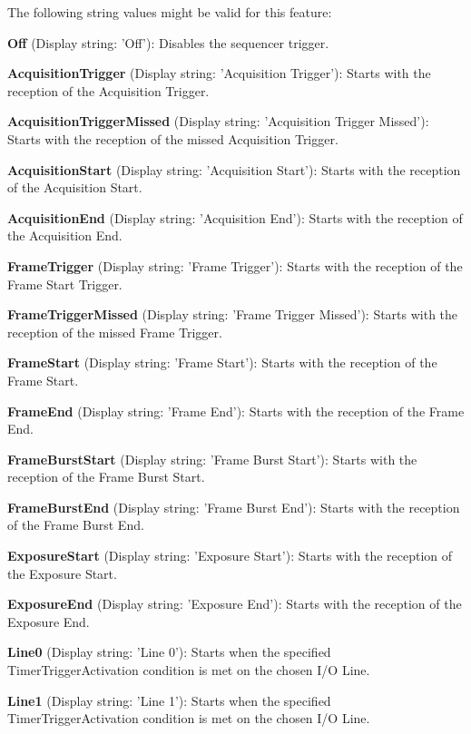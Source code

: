 The following string values might be valid for this feature\+:
\begin{DoxyItemize}
\item {\bfseries Off} (Display string\+: 'Off')\+: Disables the sequencer trigger.
\item {\bfseries Acquisition\+Trigger} (Display string\+: 'Acquisition Trigger')\+: Starts with the reception of the Acquisition Trigger.
\item {\bfseries Acquisition\+Trigger\+Missed} (Display string\+: 'Acquisition Trigger Missed')\+: Starts with the reception of the missed Acquisition Trigger.
\item {\bfseries Acquisition\+Start} (Display string\+: 'Acquisition Start')\+: Starts with the reception of the Acquisition Start.
\item {\bfseries Acquisition\+End} (Display string\+: 'Acquisition End')\+: Starts with the reception of the Acquisition End.
\item {\bfseries Frame\+Trigger} (Display string\+: 'Frame Trigger')\+: Starts with the reception of the Frame Start Trigger.
\item {\bfseries Frame\+Trigger\+Missed} (Display string\+: 'Frame Trigger Missed')\+: Starts with the reception of the missed Frame Trigger.
\item {\bfseries Frame\+Start} (Display string\+: 'Frame Start')\+: Starts with the reception of the Frame Start.
\item {\bfseries Frame\+End} (Display string\+: 'Frame End')\+: Starts with the reception of the Frame End.
\item {\bfseries Frame\+Burst\+Start} (Display string\+: 'Frame Burst Start')\+: Starts with the reception of the Frame Burst Start.
\item {\bfseries Frame\+Burst\+End} (Display string\+: 'Frame Burst End')\+: Starts with the reception of the Frame Burst End.
\item {\bfseries Exposure\+Start} (Display string\+: 'Exposure Start')\+: Starts with the reception of the Exposure Start.
\item {\bfseries Exposure\+End} (Display string\+: 'Exposure End')\+: Starts with the reception of the Exposure End.
\item {\bfseries Line0} (Display string\+: 'Line 0')\+: Starts when the specified Timer\+Trigger\+Activation condition is met on the chosen I/\+O Line.
\item {\bfseries Line1} (Display string\+: 'Line 1')\+: Starts when the specified Timer\+Trigger\+Activation condition is met on the chosen I/\+O Line.

\end{DoxyItemize}
